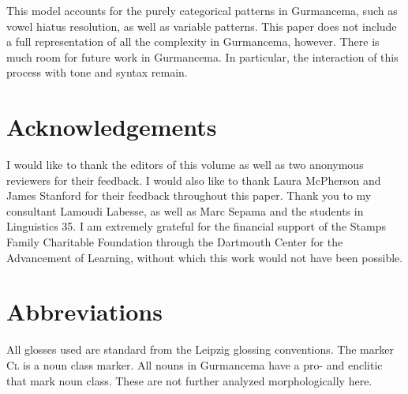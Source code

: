 \documentclass[output=paper,newtxmath,modfonts,nonflat,draftmode]{langsci/langscibook}
\begin{document}
This model accounts for the purely categorical patterns in Gurmancema, such as vowel hiatus resolution, as well as variable patterns. This paper does not include a full representation of all the complexity in Gurmancema, however. There is much room for future work in Gurmancema. In particular, the interaction of this process with tone and syntax remain. 

\section*{Acknowledgements}

I would like to thank the editors of this volume as well as two anonymous reviewers for their feedback. I would also like to thank Laura McPherson and James Stanford for their feedback throughout this paper. Thank you to my consultant Lamoudi Labesse, as well as Marc Sepama and the 
students in Linguistics 35. I am extremely grateful for the financial support of the Stamps Family Charitable Foundation through the Dartmouth Center for the Advancement of 
Learning, without which this work would not have been possible. 

\section*{Abbreviations}
All glosses used are standard from the Leipzig glossing conventions. The marker \textsc{Cl} is a noun class marker. All nouns in Gurmancema have a 
pro- and enclitic that mark noun class. These are not further analyzed morphologically here. 



{\sloppy
\printbibliography[heading=subbibliography,notkeyword=this] 
}
\end{document}

